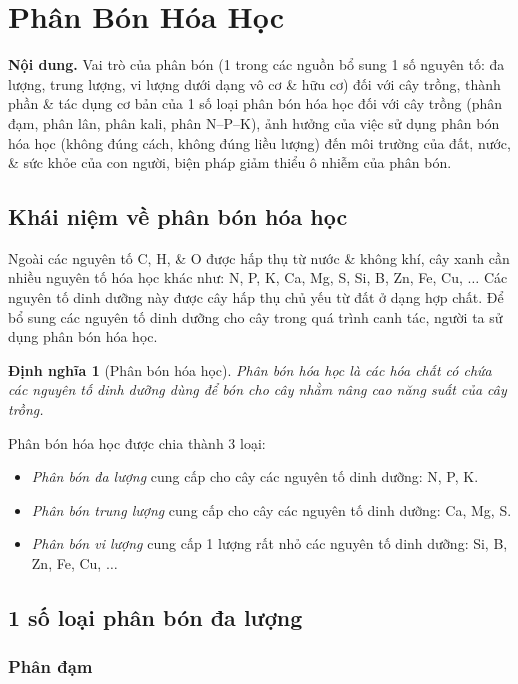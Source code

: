 \documentclass{article}
\newtheorem{dinhnghia}{Định nghĩa}
\begin{document}

\section{Phân Bón Hóa Học}
\textsf{\textbf{Nội dung.} Vai trò của phân bón (1 trong các nguồn bổ sung 1 số nguyên tố: đa lượng, trung lượng, vi lượng dưới dạng vô cơ \& hữu cơ) đối với cây trồng, thành phần \& tác dụng cơ bản của 1 số loại phân bón hóa học đối với cây trồng (phân đạm, phân lân, phân kali, phân N--P--K), ảnh hưởng của việc sử dụng phân bón hóa học (không đúng cách, không đúng liều lượng) đến môi trường của đất, nước, \& sức khỏe của con người, biện pháp giảm thiểu ô nhiễm của phân bón.}

\subsection{Khái niệm về phân bón hóa học}
Ngoài các nguyên tố C, H, \& O được hấp thụ từ nước \& không khí, cây xanh cần nhiều nguyên tố hóa học khác như: N, P, K, Ca, Mg, S, Si, B, Zn, Fe, Cu, $\ldots$ Các nguyên tố dinh dưỡng này được cây hấp thụ chủ yếu từ đất ở dạng hợp chất. Để bổ sung các nguyên tố dinh dưỡng cho cây trong quá trình canh tác, người ta sử dụng phân bón hóa học.

\begin{dinhnghia}[Phân bón hóa học]
	{\rm Phân bón hóa học} là các hóa chất có chứa các nguyên tố dinh dưỡng dùng để bón cho cây nhằm nâng cao năng suất của cây trồng.
\end{dinhnghia}
Phân bón hóa học được chia thành 3 loại:
\begin{itemize}
	\item \textit{Phân bón đa lượng} cung cấp cho cây các nguyên tố dinh dưỡng: N, P, K.
	\item \textit{Phân bón trung lượng} cung cấp cho cây các nguyên tố dinh dưỡng: Ca, Mg, S.
	\item \textit{Phân bón vi lượng} cung cấp 1 lượng rất nhỏ các nguyên tố dinh dưỡng: Si, B, Zn, Fe, Cu, $\ldots$
\end{itemize}

\subsection{1 số loại phân bón đa lượng}

\subsubsection{Phân đạm}
\end{document}
